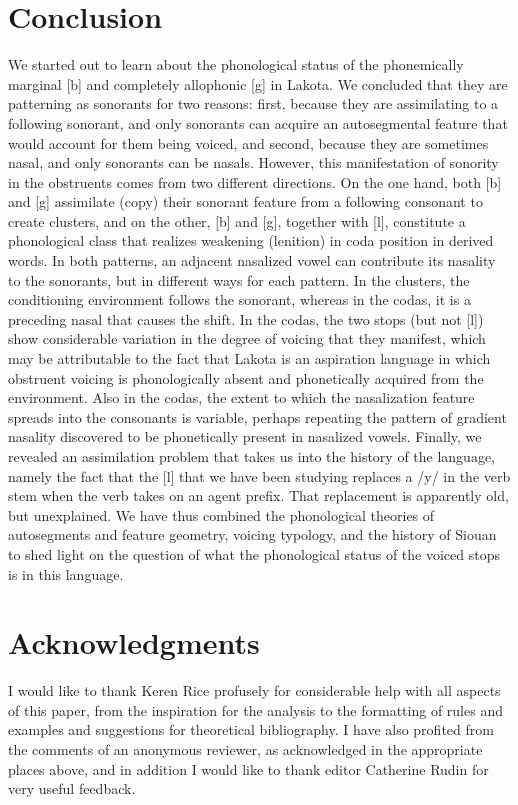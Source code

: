 \documentclass[output=paper]{LSP/langsci}
\begin{document}
\section{Conclusion}

We started out to learn about the phonological status of the phonemically marginal [b] and completely allophonic [g] in Lakota. We concluded that they are patterning as sonorants for two reasons: first, because they are assimilating to a following sonorant, and only sonorants can acquire an autosegmental feature that would account for them being voiced, and second, because they are sometimes nasal, and only sonorants can be nasals. However, this manifestation of sonority in the obstruents comes from two different directions. On the one hand, both [b] and [g] assimilate (copy) their sonorant feature from a following consonant to create clusters, and on the other, [b] and [g], together with [l], constitute a phonological class that realizes weakening (lenition) in coda position in derived words. In both patterns, an adjacent nasalized vowel can contribute its nasality to the sonorants, but in different ways for each pattern. In the clusters, the conditioning environment follows the sonorant, whereas in the codas, it is a preceding nasal that causes the shift. In the codas, the two stops (but not [l]) show considerable variation in the degree of voicing that they manifest, which may be attributable to the fact that Lakota is an aspiration language in which obstruent voicing is phonologically absent and phonetically acquired from the environment. Also in the codas, the extent to which the nasalization feature spreads into the consonants is variable, perhaps repeating the pattern of gradient nasality discovered to be phonetically present in nasalized vowels. Finally, we revealed an assimilation problem that takes us into the history of the language, namely the fact that the [l] that we have been studying replaces a /y/ in the verb stem when the verb takes on an agent prefix. That replacement is apparently old, but unexplained.
We have thus combined the phonological theories of autosegments and feature geometry, voicing typology, and the history of Siouan to shed light on the question of what the phonological status of the voiced stops is in this language.

\section*{Acknowledgments}

I would like to thank Keren Rice profusely for considerable help with all aspects of this paper, from the inspiration for the analysis to the formatting of rules and examples and suggestions for theoretical bibliography. I have also profited from the comments of an anonymous reviewer, as acknowledged in the appropriate places above, and in addition I would like to thank editor Catherine Rudin for very useful feedback.
\end{document}
